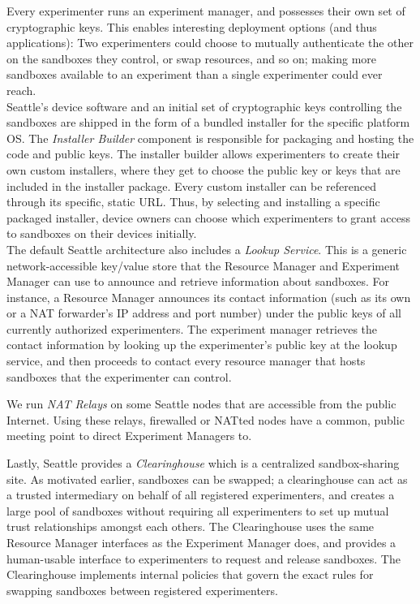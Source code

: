 Every experimenter runs an experiment manager, and possesses
their own set of cryptographic keys. This enables interesting
deployment options (and thus applications):
Two experimenters could choose to mutually authenticate the
other on the sandboxes they control, or swap resources, and
so on; making more sandboxes available to an experiment than
a single experimenter could ever reach.
\\

Seattle's device software and an initial set of cryptographic
keys controlling the sandboxes are shipped in the form of a bundled
installer for the specific platform \gls{OS}.
The \textit{Installer Builder} component is responsible for
packaging and hosting the code and public keys.
The installer builder allows experimenters to create their own
custom installers, where they get to choose the public key or keys
that are included in the installer package. Every custom installer
can be referenced through its specific, static \gls{URL}.
Thus, by selecting and installing a specific packaged installer,
device owners can choose which experimenters to grant
access to sandboxes on their devices initially.
\\


The default Seattle architecture also includes a
\textit{Lookup Service}. This is a generic network-accessible
key/value store that the Resource Manager and Experiment Manager
can use to announce and retrieve information about sandboxes.
For instance, a Resource Manager announces its contact information
(such as its own or a \gls{NAT} forwarder's \gls{IP} address and port number) under
the public keys of all currently authorized experimenters.
The experiment manager retrieves the contact information by looking up
the experimenter's public key at the lookup service, and then
proceeds to contact every resource manager that hosts sandboxes
that the experimenter can control.

We run \textit{\gls{NAT} Relays} on some Seattle nodes that are
accessible from the public Internet. Using these relays, firewalled
or \gls{NAT}ted nodes have a common, public meeting point to
direct Experiment Managers to.

Lastly, Seattle provides a \textit{Clearinghouse} which is a
centralized sandbox-sharing site. As motivated earlier,
sandboxes can be swapped; a clearinghouse can act as a trusted
intermediary on behalf of all registered experimenters, and creates
a large pool of sandboxes without requiring all experimenters to
set up mutual trust relationships amongst each others.
The Clearinghouse uses the same Resource Manager interfaces as the
Experiment Manager does, and provides a human-usable interface to
experimenters to request and release sandboxes.
The Clearinghouse implements internal policies
that govern the exact rules for swapping sandboxes between
registered experimenters.

